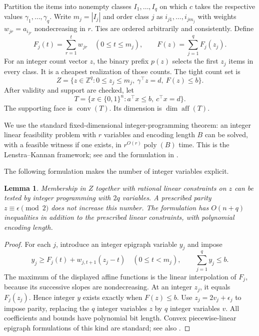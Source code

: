 \documentclass[11pt]{article}
\newtheorem{lemma}[theorem]{Lemma}
\newcommand{\Z}{\mathbb Z}\newcommand{\R}{\mathbb R}
\newcommand{\aff}{\operatorname{aff}}\newcommand{\spn}{\operatorname{span}}
\begin{document}
Partition the items into nonempty classes $I_1,\ldots,I_q$ on which $c$ takes the respective values $\gamma_1,\ldots,\gamma_q$. Write $m_j=|I_j|$ and order class $j$ as $i_{j1},\ldots,i_{jm_j}$ with weights $w_{jr}=a_{i_{jr}}$ nondecreasing in $r$. Ties are ordered arbitrarily and consistently. Define
\[
 F_j(t)=\sum_{r=1}^{t}w_{jr}\quad(0\le t\le m_j),\qquad
 F(z)=\sum_{j=1}^q F_j(z_j).
\]
For an integer count vector $z$, the binary prefix $p(z)$ selects the first $z_j$ items in every class. It is a cheapest realization of those counts. The tight count set is
\begin{equation}\label{eq:Z}
 Z=\{z\in\Z^q:0\le z_j\le m_j,\ \gamma^\top z=d,\ F(z)\le b\}.
\end{equation}
After validity and support are checked, let
\[
 T=\{x\in\{0,1\}^n:a^\top x\le b,\ c^\top x=d\}.
\]
The supporting face is $\operatorname{conv}(T)$. Its dimension is $\dim\aff(T)$.

We use the standard fixed-dimensional integer-programming theorem: an integer linear feasibility problem with $r$ variables and encoding length $B$ can be solved, with a feasible witness if one exists, in $r^{O(r)}\operatorname{poly}(B)$ time. This is the Lenstra--Kannan framework; see \cite{Lenstra,Kannan} and the formulation in \cite[Theorem 1]{Bredereck}.

The following formulation makes the number of integer variables explicit.
\begin{lemma}\label{lem:oracle}
Membership in $Z$ together with rational linear constraints on $z$ can be tested by integer programming with $2q$ variables. A prescribed parity $z\equiv\epsilon\pmod2$ does not increase this number. The formulation has $O(n+q)$ inequalities in addition to the prescribed linear constraints, with polynomial encoding length.
\end{lemma}
\begin{proof}
For each $j$, introduce an integer epigraph variable $y_j$ and impose
\[
 y_j\ge F_j(t)+w_{j,t+1}(z_j-t)\quad(0\le t<m_j),
 \qquad \sum_{j=1}^q y_j\le b.
\]
The maximum of the displayed affine functions is the linear interpolation of $F_j$, because its successive slopes are nondecreasing. At an integer $z_j$, it equals $F_j(z_j)$. Hence integer $y$ exists exactly when $F(z)\le b$. Use $z_j=2v_j+\epsilon_j$ to impose parity, replacing the $q$ integer variables $z$ by $q$ integer variables $v$. All coefficients and bounds have polynomial bit length. Convex piecewise-linear epigraph formulations of this kind are standard; see also \cite[Theorem 2]{Bredereck}.
\end{proof}
\end{document}
